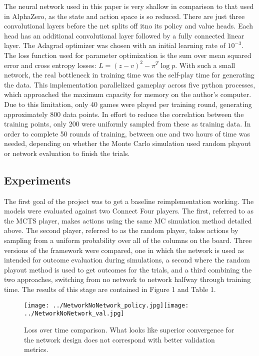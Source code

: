 \documentclass[twoside,11pt]{article}
\begin{document}
The neural network used in this paper is very shallow in comparison to that used in AlphaZero, 
as the state and action space is so reduced. There are just three convolutional layers before
the net splits off itno its policy and value heads. Each head has an additional convolutional 
layer followed by a fully connected linear layer. The Adagrad optimizer was chosen with an
initial learning rate of $10^{-3}$. 
The loss function used for parameter optimization is the sum 
over mean squared error and cross entropy losses: $L = (z-v)^2 - \pi^T \log p$.
With such a small network, the real bottleneck in training time was the self-play 
time for generating the data. This implementation parallelized gameplay across five python
processes, which approached the maximum capacity for memory on the author's computer. Due to
this limitation, only 40 games were played per training round, generating approximately 800 data points. 
In effort to reduce the correlation between the training points, only 200 were uniformly sampled
from these as training data. In order to complete 50 rounds of training, between one and two
hours of time was needed, depending on whether the Monte Carlo simulation used random
playout or network evaluation to finish the trials.


\subsection{Experiments}
The first goal of the project was to get a baseline reimplementation working. 
The models were evaluated against two Connect Four players. The first, referred to
as the MCTS player, makes actions using the same MC simulation method detailed above.
The second player, referred to as the random player, takes actions by sampling 
from a uniform probability over all of the columns on the board. 
Three versions of the framework were compared, one in which the network is used
as intended for outcome evaluation during simulations, a second where the random 
playout method is used to get outcomes for the trials, and a third combining 
the two approaches, switching from no network to network halfway through training time.
The results of this stage are contained in Figure 1 and Table 1.

\begin{figure}[h]
    \centering
    \texttt{[image: ../NetworkNoNetwork\_policy.jpg]}\texttt{[image: ../NetworkNoNetwork\_val.jpg]}
    \caption{Loss over time comparison. What looks like superior convergence for the network design does not correspond 
    with better validation metrics.}
\end{figure}
\end{document}
